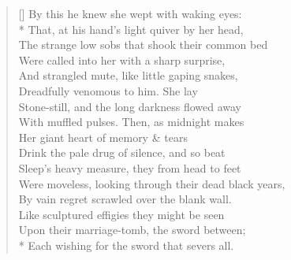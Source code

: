 \documentclass[MAIN]{subfiles}
\begin{document}
\settowidth{\versewidth}{The strange low sobs that shook their common bed}
\begin{verse}[\versewidth]
By this he knew she wept with waking eyes:\\* 
\vin That, at his hand's light quiver by her head,\\
\vin The strange low sobs that shook their common bed\\
Were called into her with a sharp surprise,\\
And strangled mute, like little gaping snakes,\\
\vin Dreadfully venomous to him. She lay\\
\vin Stone-still, and the long darkness flowed away\\
With muffled pulses. Then, as midnight makes\\
Her giant heart of memory \& tears\\
\vin Drink the pale drug of silence, and so beat\\
\vin Sleep's heavy measure, they from head to feet\\
Were moveless, looking through their dead black years,\\
By vain regret scrawled over the blank wall.\\
\vin Like sculptured effigies they might be seen\\
\vin Upon their marriage-tomb, the sword between;\\*
Each wishing for the sword that severs all.
\end{verse}
\end{document}
